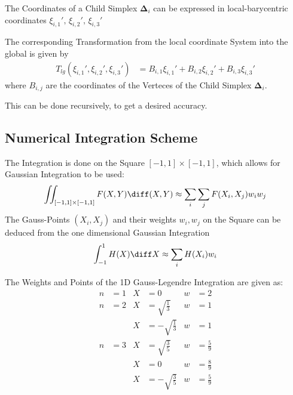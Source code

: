\documentclass{mitschrift}
\newcommand{\simplex}{\boldsymbol{\Delta}}
\begin{document}
The Coordinates of a Child Simplex $\simplex_i$ can be expressed in local-barycentric coordinates $\xi_{i,1}',\, \xi_{i,2}',\, \xi_{i,3}'$

The corresponding Transformation from the local coordinate System into the global is given by \begin{align}
   T_{lg}(\xi_{i,1}', \xi_{i,2}', \xi_{i,3}') &= B_{i,1}\xi_{i,1}' + B_{i,2}\xi_{i,2}' + B_{i,3} \xi_{i,3}'
\end{align} where $B_{i,j}$ are the coordinates of the Verteces of the Child Simplex $\simplex_i$.

This can be done recursively, to get a desired accuracy.
%

\subsection{Numerical Integration Scheme}

The Integration is done on the Square $[-1,1] \times [-1, 1]$, which allows for Gaussian Integration to be used: \begin{equation}
    \iint_{[-1,1] \times [-1, 1]} F(X,Y) \diff (X,Y) \approx \sum_i \sum_j F(X_i,X_j) w_i w_j 
\end{equation}
The Gauss-Points $(X_i, X_j)$ and their weights $w_i,w_j$ on the Square can be deduced from the one dimensional Gaussian Integration \begin{equation}
    \int_{-1}^1 H(X) \diff X \approx \sum_i H(X_i) w_i
\end{equation}

The Weights and Points of the 1D Gauss-Legendre Integration are given as: \begin{align*}
    n &= 1 & X &= 0 & w &= 2 \\
    n &= 2 & X &= \sqrt{\frac{1}{3}} & w &= 1 \\
    & & X &= -\sqrt{\frac{1}{3}} & w &= 1 \\
    n &= 3 & X &= \sqrt{\frac{3}{5}} & w &= \frac{5}{9} \\
    & & X &= 0 & w &= \frac{8}{9} \\
    & & X &= -\sqrt{\frac{3}{5}} & w &= \frac{5}{9} \\
\end{align*}
\end{document}
